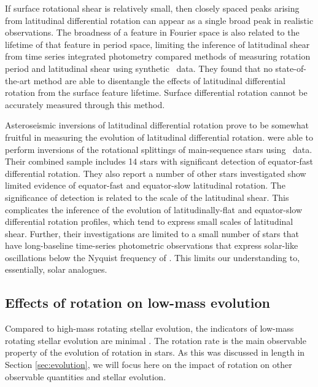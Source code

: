 If surface rotational shear is relatively small, then closely spaced peaks arising from latitudinal differential rotation can appear as a single broad peak in realistic observations.
The broadness of a feature in Fourier space is also related to the lifetime of that feature in period space, limiting the inference of latitudinal shear from time series integrated photometry
\citet{aigrain_hare_2015} compared methods of measuring rotation period and latitudinal shear using synthetic \kepler\ data.
They found that no state-of-the-art method \citep[e.g., those adopted by ][]{reinhold_rotation_2013, mcquillan_rotation_2014, garcia_rotation_2014} are able to disentangle the effects of latitudinal differential rotation from the surface feature lifetime.
Surface differential rotation cannot be accurately measured through this method.

Asteroseismic inversions of latitudinal differential rotation prove to be somewhat fruitful in measuring the evolution of latitudinal differential rotation.
\citet{benomar_asteroseismic_2018, bazot_latitudinal_2019, hall_weakened_2021} were able to perform inversions of the rotational splittings of main-sequence stars using \kepler\ data.
Their combined sample includes 14 stars with significant detection of equator-fast differential rotation.
They also report a number of other stars investigated show limited evidence of equator-fast and equator-slow latitudinal rotation.
The significance of detection is related to the scale of the latitudinal shear.
This complicates the inference of the evolution of latitudinally-flat and equator-slow differential rotation profiles, which tend to express small scales of latitudinal shear.
Further, their investigations are limited to a small number of stars that have long-baseline time-series photometric observations that express solar-like oscillations below the Nyquist frequency of \kepler{}.
This limits our understanding to, essentially, solar analogues.


\subsection{Effects of rotation on low-mass evolution}
\label{sec:effects}

Compared to high-mass rotating stellar evolution, the indicators of low-mass rotating stellar evolution are minimal \citep[see, e.g.,][]{heger_presupernova_2000, maeder_evolution_2000}.
The rotation rate is the main observable property of the evolution of rotation in stars.
As this was discussed in length in Section \ref{sec:evolution}, we will focus here on the impact of rotation on other observable quantities and stellar evolution.


